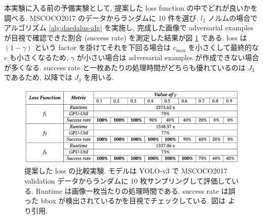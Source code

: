 本実験に入る前の予備実験として, 提案した loss function の中でどれが良いかを調べる.
MSCOCO2017 のデータからランダムに 10 件を選び, $l_2$ ノルムの場合でアルゴリズム \ref{alg:daedalus-alg} を実施し, 完成した画像で adversarial examples が目視で確認できた割合 (success rate) を測定した結果が図 \ref{fig:daedalus-loss-exp} である.
loss は $(1 - \gamma)$ という factor を掛けてそれを下回る場合は $c_{\text{max}}$ を小さくして最終的な $c$ も小さくなるため, $\gamma$ が小さい場合は adversarial examples が作成できない場合が多くなる.
success rate と一枚あたりの処理時間がどちらも優れているのは $J_3$ であるため, 以降では $J_3$ を用いる.
%
\begin{figure}[htbp]
\begin{center}
\includegraphics[width=14.0cm]{figures/daedalus-loss-exp.pdf}
\end{center}
\caption{
提案した loss の比較実験.
モデルは YOLO-v3 で MSCOCO2017 validation データからランダムに 10 枚サンプリングして評価している.
Runtime は画像一枚当たりの処理時間である.
success rate は誤った bbox が検出されているかを目視でチェックしている.
図は \cite{wang2019daedalus} より引用.
}
\label{fig:daedalus-loss-exp}
\end{figure}
%

